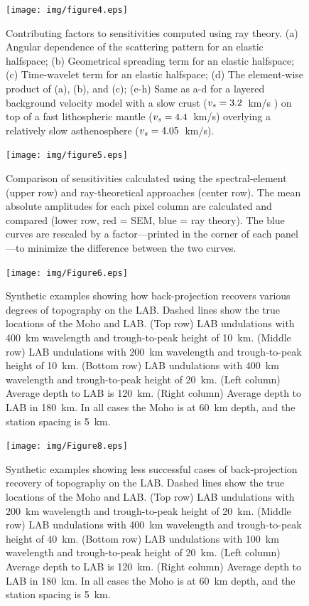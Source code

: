 \documentclass[referee]{gji}
\begin{document}
\begin{figure}
\centering
\texttt{[image: img/figure4.eps]}
\caption{Contributing factors to sensitivities computed using ray theory. (a) Angular dependence of the scattering pattern for an elastic halfspace; (b) Geometrical spreading term for an elastic halfspace; (c) Time-wavelet term for an elastic halfspace; (d) The element-wise product of (a), (b), and (c); (e-h) Same as a-d for a layered background velocity model with a slow crust ($v_s = 3.2$~km/s ) on top of a fast lithospheric mantle ($v_s = 4.4$~km/s) overlying a relatively slow asthenosphere ($v_s=4.05$~km/s).}
\label{fig:KernelPieces}
\end{figure}

\begin{figure}
\centering
\texttt{[image: img/figure5.eps]}
\caption{Comparison of sensitivities calculated using the spectral-element (upper row) and ray-theoretical approaches (center row).  The mean absolute amplitudes for each pixel column are calculated and compared (lower row, red = SEM, blue = ray theory).  The blue curves are rescaled by a factor---printed in the corner of each panel---to minimize the difference between the two curves.}
\label{fig:KernelEquivalence}
\end{figure}

\begin{figure}
\centering
\texttt{[image: img/Figure6.eps]}
\caption{Synthetic examples showing how back-projection recovers various degrees of topography on the LAB.
Dashed lines show the true locations of the Moho and LAB.
(Top row) LAB undulations with 400~km wavelength and trough-to-peak height of 10~km.
(Middle row) LAB undulations with 200~km wavelength and trough-to-peak height of 10~km.
(Bottom row) LAB undulations with 400~km wavelength and trough-to-peak height of 20~km.
(Left column) Average depth to LAB is 120~km.
(Right column) Average depth to LAB in 180~km.
In all cases the Moho is at 60~km depth, and the station spacing is 5~km.}
\label{fig:LABStructures}
\end{figure}

\begin{figure}
\centering
\texttt{[image: img/Figure8.eps]}
\caption{Synthetic examples showing less successful cases of back-projection recovery of topography on the LAB.
Dashed lines show the true locations of the Moho and LAB.
(Top row) LAB undulations with 200~km wavelength and trough-to-peak height of 20~km.
(Middle row) LAB undulations with 400~km wavelength and trough-to-peak height of 40~km.
(Bottom row) LAB undulations with 100~km wavelength and trough-to-peak height of 20~km.
(Left column) Average depth to LAB is 120~km.
(Right column) Average depth to LAB in 180~km.
In all cases the Moho is at 60~km depth, and the station spacing is 5~km.}
\label{fig:BadExamples}
\end{figure}
\end{document}

